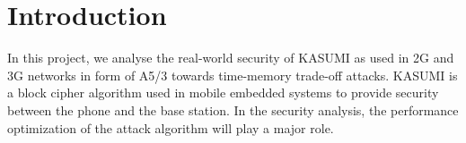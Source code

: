 \chapter{Introduction}

In this project, we analyse the real-world security of KASUMI as used in 2G and 3G networks in form of A5/3 towards time-memory trade-off attacks. KASUMI is a block cipher algorithm used in mobile embedded systems to provide security between the phone and the base station. In the security analysis, the performance optimization of the attack algorithm will play a major role.




